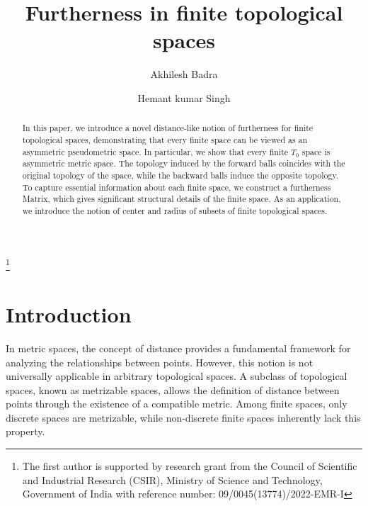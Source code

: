 \documentclass[12pt]{amsart}
\begin{document}
	\title{Furtherness in finite topological spaces}
	\author[A. Badra]{Akhilesh Badra}
	\address{AKHILESH BADRA; Department of Mathematics, University of Delhi,
		Delhi--110 007, India}
	\author[H. K. Singh]{Hemant kumar Singh}
	\address{HEMANT KUMAR SINGH; Department of Mathematics, University of Delhi,
		Delhi--110 007, India}
	\thanks{The first author is supported by research grant from the Council of Scientific and Industrial Research (CSIR), Ministry of Science and Technology, Government of India with reference number: 09/0045(13774)/2022-EMR-I}
	
	
	
	
	
	
	\maketitle
	\begin{abstract}
		In this paper, we introduce a novel distance-like notion of furtherness for finite topological spaces, demonstrating that every finite space can be viewed as an asymmetric pseudometric space. In particular, we show that every finite $T_0$ space is asymmetric metric space. The topology induced by the forward balls coincides with the original topology of the space, while the backward balls induce the opposite topology. To capture essential information about each finite space, we construct a furtherness Matrix, which gives significant structural details of the finite space. As an application, we introduce the notion of center and radius of subsets of finite topological spaces.
		
		
		
	\end{abstract}
	
	
	
	\section{\textbf{Introduction}}
	
	In metric spaces, the concept of distance provides a fundamental framework for analyzing the relationships between points. However, this notion is not universally applicable in arbitrary topological spaces. A subclass of topological spaces, known as metrizable spaces, allows the definition of distance between points through the existence of a compatible metric. Among finite spaces, only discrete spaces are metrizable, while non-discrete finite spaces inherently lack this property.  
	
\end{document}
